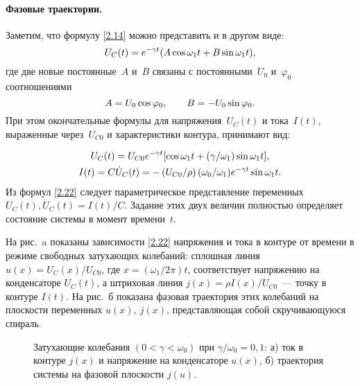 \documentclass[a4paper,oneside]{book}
\begin{document}
\paragraph{Фазовые траектории.}
Заметим, что формулу \eqref{2.14} можно представить и в другом виде:
\begin{equation}\eqmark{2.20}
U_C(t)=e^{-\gamma t}(A\cos\omega_1 t+B\sin\omega_1 t),
\end{equation}
где две новые постоянные~$A$ и~$B$ связаны с постоянными~$U_0$ и~$\varphi_0$
соотношениями
\begin{equation}\eqmark{2.21}
A=U_0\cos\varphi_0, \qquad B=-U_0\sin\varphi_0.
\end{equation}
При этом окончательные формулы для напряжения~$U_C(t)$ и тока~$I(t)$, выраженные
через~$U_{C0}$ и характеристики контура, принимают вид:

\begin{equation}
	\eqmark{2.22}
		\begin{gathered}[c]
			U_C(t)=U_{C0}e^{-\gamma
t}[\cos\omega_1t+(\gamma/\omega_1)\sin\omega_1t], \\
			I(t)=C\dot{U}_C(t)
=-\left(U_{C0}/\rho\right)(\omega_0/\omega_1)e^{-\gamma t}\sin\omega_1t.
		\end{gathered}
\end{equation}
Из формул \eqref{2.22} следует параметрическое представление
 переменных $U_C(t),
\dot{U}_C(t)=I(t)/C$. Задание этих двух величин полностью определяет состояние
системы в момент времени~$t$.

На рис.~a показаны 
зависимости \eqref{2.22} напряжения и тока в контуре от времени в режиме
свободных затухающих колебаний: сплошная линия $u(x)=U_C(x)/U_{C0}$, где
$x=(\omega_1/2\pi)t$, соответствует напряжению на конденсаторе $U_C(t)$, а
штриховая линия $j(x)=\rho I(x)/U_{C0}$~--- точку в контуре $I(t)$. На
рис.~б показана фазовая траектория этих колебаний на плоскости
переменных   $u(x),~j(x)$, представляющая собой скручивающуюся спираль.

\begin{figure}[h]
	\begin{minipage}[h]{0.5\linewidth}
	\end{minipage}
	\hfill
	\begin{minipage}[h]{0.5\linewidth}
	\end{minipage}
	\caption{Затухающие колебания $(0<\gamma<\omega_0)$ при
$\gamma/\omega_0=0,1$:
а) ток в контуре $j(x)$ и напряжение на конденсаторе $u(x)$,
б) траектория системы на фазовой плоскости $j(u)$.}
\end{figure}
\end{document}
